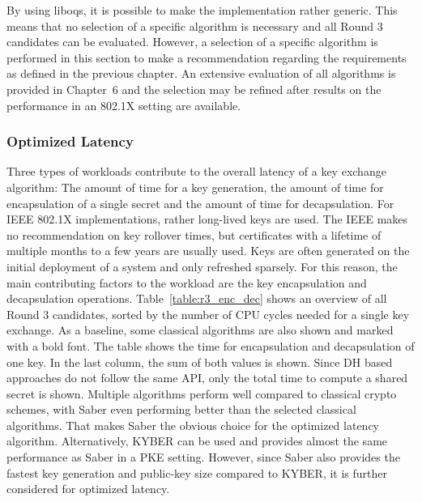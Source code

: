 By using liboqs, it is possible to make the implementation rather generic. This means that no selection of a specific algorithm is necessary and all Round 3 candidates can be evaluated. However, a selection of a specific algorithm is performed in this section to make a recommendation regarding the requirements as defined in the previous chapter. An extensive evaluation of all algorithms is provided in Chapter~6 and the selection may be refined after results on the performance in an 802.1X setting are available. 

\subsubsection{Optimized Latency}

Three types of workloads contribute to the overall latency of a key exchange algorithm: The amount of time for a key generation, the amount of time for encapsulation of a single secret and the amount of time for decapsulation. For IEEE 802.1X implementations, rather long-lived keys are used. The IEEE makes no recommendation on key rollover times, but certificates with a lifetime of multiple months to a few years are usually used. Keys are often generated on the initial deployment of a system and only refreshed sparsely. For this reason, the main contributing factors to the workload are the key encapsulation and decapsulation operations. Table~\ref{table:r3_enc_dec} shows an overview of all Round 3 candidates, sorted by the number of \acs{CPU} cycles needed for a single key exchange. As a baseline, some classical algorithms are also shown and marked with a bold font. The table shows the time for encapsulation and decapsulation of one key. In the last column, the sum of both values is shown. Since DH based approaches do not follow the same API, only the total time to compute a shared secret is shown. Multiple algorithms perform well compared to classical crypto schemes, with Saber even performing better than the selected classical algorithms. That makes Saber the obvious choice for the optimized latency algorithm. Alternatively, KYBER can be used and provides almost the same performance as Saber in a PKE setting. However, since Saber also provides the fastest key generation and public-key size compared to KYBER, it is further considered for optimized latency.

